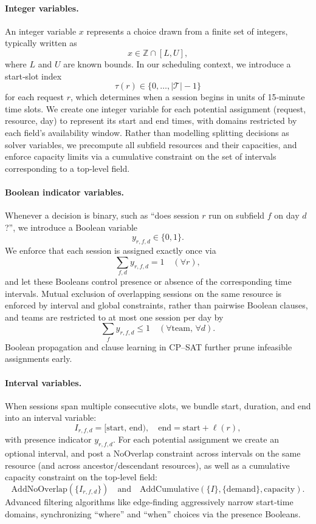 \documentclass[12pt]{article}
\begin{document}
\paragraph{Integer variables.}
An integer variable $x$ represents a choice drawn from a finite set of integers, typically written as
\[
  x \in \mathbb{Z} \cap [L,U],
\]
where $L$ and $U$ are known bounds. In our scheduling context, we introduce a start‐slot index
\[
  \tau(r) \in \{0,\dots,|\mathcal T|-1\}
\]
for each request $r$, which determines when a session begins in units of 15‐minute time slots. We create one integer variable for each potential assignment (request, resource, day) to represent its start and end times, with domains restricted by each field’s availability window. Rather than modelling splitting decisions as solver variables, we precompute all subfield resources and their capacities, and enforce capacity limits via a cumulative constraint on the set of intervals corresponding to a top‐level field.

\paragraph{Boolean indicator variables.}
Whenever a decision is binary, such as “does session $r$ run on subfield $f$ on day $d$?”, we introduce a Boolean variable
\[
  y_{r,f,d} \in \{0,1\}.
\]
We enforce that each session is assigned exactly once via
\[
  \sum_{f,d} y_{r,f,d} = 1 \quad (\forall r),
\]
and let these Booleans control presence or absence of the corresponding time intervals. Mutual exclusion of overlapping sessions on the same resource is enforced by interval and global constraints, rather than pairwise Boolean clauses, and teams are restricted to at most one session per day by
\[
  \sum_{f} y_{r,f,d} \le 1 \quad (\forall \text{team},\,\forall d).
\]
Boolean propagation and clause learning in CP–SAT further prune infeasible assignments early.

\paragraph{Interval variables.}
When sessions span multiple consecutive slots, we bundle start, duration, and end into an interval variable:
\[
  I_{r,f,d} = [\mathrm{start},\,\mathrm{end}),
\quad
\mathrm{end} = \mathrm{start} + \ell(r),
\]
with presence indicator $y_{r,f,d}$. For each potential assignment we create an optional interval, and post a NoOverlap constraint across intervals on the same resource (and across ancestor/descendant resources), as well as a cumulative capacity constraint on the top‐level field:
\[
  \text{AddNoOverlap}(\{I_{r,f,d}\})
  \quad
  \text{and}
  \quad
  \text{AddCumulative}(\{I\},\{\text{demand}\},\text{capacity}).
\]
Advanced filtering algorithms like edge‐finding aggressively narrow start‐time domains, synchronizing “where” and “when” choices via the presence Booleans.
\end{document}
